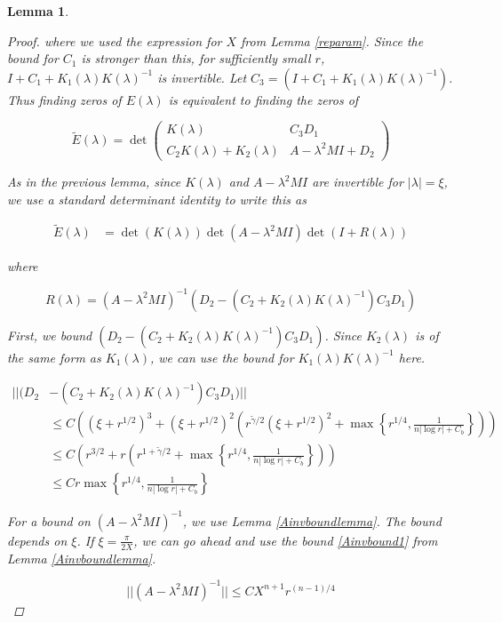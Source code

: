 \documentclass[12pt]{article}
\newtheorem{lemma}{Lemma}
\begin{document}
\begin{lemma}
\begin{proof}
where we used the expression for $X$ from Lemma \ref{reparam}. Since the bound for $C_1$ is stronger than this, for sufficiently small $r$, $I + C_1 + K_1(\lambda)K(\lambda)^{-1}$ is invertible. Let $C_3 = (I + C_1 + K_1(\lambda)K(\lambda)^{-1})$. Thus finding zeros of $E(\lambda)$ is equivalent to finding the zeros of

\begin{equation}
\tilde{E}(\lambda) = \det 
\begin{pmatrix}
K(\lambda) & C_3 D_1 \\
C_2 K(\lambda) + K_2(\lambda) & A - \lambda^2 MI + D_2
\end{pmatrix}
\end{equation}

As in the previous lemma, since $K(\lambda)$ and $A - \lambda^2 M I$ are invertible for $|\lambda| = \xi$, we use a standard determinant identity to write this as

\begin{align*}
\tilde{E}(\lambda)
&= \det(K(\lambda))\det(A - \lambda^2 MI)\det(I + R(\lambda))
\end{align*}

where

\[
R(\lambda) = 
(A - \lambda^2 MI)^{-1}(D_2 - (C_2 + K_2(\lambda)K(\lambda)^{-1})C_3 D_1)
\]

First, we bound $(D_2 - (C_2 + K_2(\lambda)K(\lambda)^{-1})C_3 D_1)$. Since $K_2(\lambda)$ is of the same form as $K_1(\lambda)$, we can use the bound for $K_1(\lambda)K(\lambda)^{-1}$ here.

\begin{align*}
||(D_2 &- (C_2 + K_2(\lambda)K(\lambda)^{-1})C_3 D_1)|| \\
&\leq C \left( (\xi + r^{1/2})^3 + (\xi + r^{1/2})^2 \left( r^{\tilde{\gamma}/2}(\xi + r^{1/2})^2 + \max\left\{ r^{1/4}, \frac{1}{n|\log r| + C_b } \right\} \right) \right) \\
&\leq C \left( r^{3/2} + r \left( r^{1 + \tilde{\gamma}/2} + \max\left\{ r^{1/4}, \frac{1}{n|\log r| + C_b } \right\} \right) \right) \\
&\leq C r \max\left\{ r^{1/4}, \frac{1}{n|\log r| + C_b } \right\} 
\end{align*}

For a bound on $(A - \lambda^2 MI)^{-1}$, we use Lemma \ref{Ainvboundlemma}. The bound depends on $\xi$. If $\xi = \frac{\pi}{2X}$, we can go ahead and use the bound \eqref{Ainvbound1} from Lemma \ref{Ainvboundlemma}.

\[
||(A - \lambda^2 MI)^{-1}|| \leq C X^{n+1} r^{(n-1)/4}
\]


\end{proof}
\end{lemma}
\end{document}
